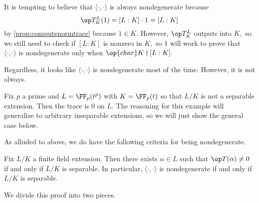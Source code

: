 \documentclass[../notes.tex]{subfiles}
\begin{document}
It is tempting to believe that $\langle\cdot,\cdot\rangle$ is always nondegenerate because
\[\op T^L_K(1)=[L:K]\cdot1=[L:K]\]
by \autoref{prop:computenormtrace} because $1\in K.$ However, $\op T^L_K$ outputs into $K,$ so we still need to check if $[L:K]$ is nonzero in $K,$ so $1$ will work to prove that $\langle\cdot,\cdot\rangle$ is nondegenerate only when $\op{char}K\nmid[L:K].$

Regardless, it looks like $\langle\cdot,\cdot\rangle$ is nondegenerate most of the time. However, it is not always.
\begin{ex}
	Fix $p$ a prime and $L=\FF_p(t^p)$ with $K=\FF_p(t)$ so that $L/K$ is not a separable extension. Then the trace is $0$ on $L.$ The reasoning for this example will generalize to arbitrary inseparable extensions, so we will just show the general case below.
\end{ex}
As alluded to above, we do have the following criteria for being nondegenerate.
\begin{theorem} \label{thm:nondegtrace}
	Fix $L/K$ a finite field extension. Then there exists $\alpha\in L$ such that $\op T(\alpha)\ne0$ if and only if $L/K$ is separable. In particular, $\langle\cdot,\cdot\rangle$ is nondegenerate if and only if $L/K$ is separable.
\end{theorem}
We divide this proof into two pieces.
\end{document}
